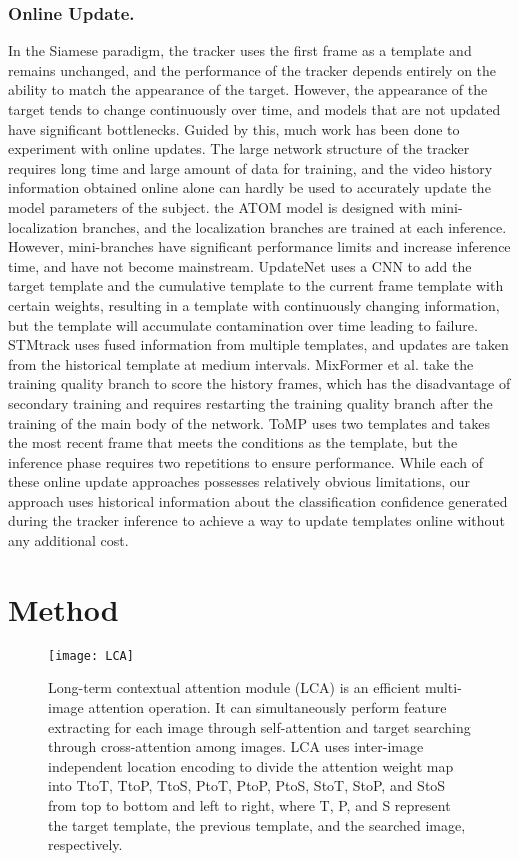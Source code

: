 \documentclass[letterpaper]{article} \usepackage{aaai23}  \usepackage{times}  \usepackage{helvet}  \usepackage{courier}  \usepackage[hyphens]{url}  \usepackage{graphicx} \urlstyle{rm} \def\UrlFont{\rm}  \usepackage{natbib}  \usepackage{caption} \frenchspacing  \setlength{\pdfpagewidth}{8.5in}  \setlength{\pdfpageheight}{11in}  \usepackage{algorithm}
\begin{document}
\subsubsection{Online Update.}
In the Siamese paradigm, the tracker uses the first frame as a template and remains unchanged, and the performance of the tracker depends entirely on the ability to match the appearance of the target. However, the appearance of the target tends to change continuously over time, and models that are not updated have significant bottlenecks. Guided by this, much work has been done to experiment with online updates. The large network structure of the tracker requires long time and large amount of data for training, and the video history information obtained online alone can hardly be used to accurately update the model parameters of the subject. the ATOM \cite{atom} model is designed with mini-localization branches, and the localization branches are trained at each inference. However, mini-branches have significant performance limits and increase inference time, and have not become mainstream. UpdateNet \cite{updatenet} uses a CNN to add the target template and the cumulative template to the current frame template with certain weights, resulting in a template with continuously changing information, but the template will accumulate contamination over time leading to failure. STMtrack \cite{stmtrack} uses fused information from multiple templates, and updates are taken from the historical template at medium intervals. MixFormer \cite{mixformer,stark}et al. take the training quality branch to score the history frames, which has the disadvantage of secondary training and requires restarting the training quality branch after the training of the main body of the network. ToMP \cite{tomp} uses two templates and takes the most recent frame that meets the conditions as the template, but the inference phase requires two repetitions to ensure performance. While each of these online update approaches possesses relatively obvious limitations, our approach uses historical information about the classification confidence generated during the tracker inference to achieve a way to update templates online without any additional cost.

\section{Method}

\begin{figure*}[t]
\centering
\texttt{[image: LCA]} \caption{Long-term contextual attention module (LCA) is an efficient multi-image attention operation. It can simultaneously perform feature extracting for each image through self-attention and target searching through cross-attention among images. LCA uses inter-image independent location encoding to divide the attention weight map into TtoT, TtoP, TtoS, PtoT, PtoP, PtoS, StoT, StoP, and StoS from top to bottom and left to right, where T, P, and S represent the target template, the previous template, and the searched image, respectively.}
\label{fig1}
\end{figure*}
\end{document}
